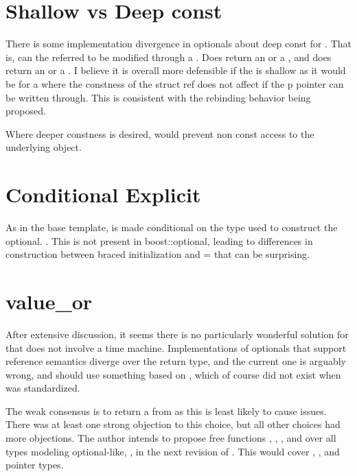 \documentclass[a4paper,10pt,oneside,openany,final,article]{memoir}
\begin{document}
\section{Shallow vs Deep const}

There is some implementation divergence in optionals about deep const for . That is, can the referred to  be modified through a . Does  return an  or a , and does  return an  or a . I believe it is overall more defensible if the  is shallow as it would be for a  where the constness of the struct ref does not affect if the p pointer can be written through. This is consistent with the rebinding behavior being proposed.

Where deeper constness is desired,  would prevent non const access to the underlying object.

\section{Conditional Explicit}
As in the base template,  is made conditional on the type used to construct the optional. . This is not present in boost::optional, leading to differences in construction between braced initialization and = that can be surprising.

\section{value_or}

After extensive discussion, it seems there is no particularly wonderful solution for  that does not involve a time machine. Implementations of optionals that support reference semantics diverge over the return type, and the current one is arguably wrong, and should use something based on , which of course did not exist when  was standardized.

The weak consensus is to return a  from  as this is least likely to cause issues. There was at least one strong objection to this choice, but all other choices had more objections. The author intends to propose free functions , , , and  over all types modeling optional-like, , in the next revision of \cite{P1255R12}. This would cover , , and pointer types.
\end{document}
